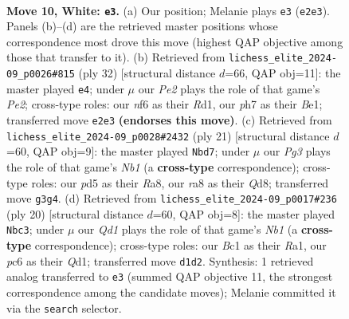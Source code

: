 \documentclass[11pt]{article}
\begin{document}
\clearpage

\begin{figure}[p]\centering
\begin{subfigure}{0.46\textwidth}\centering
\resizebox{\linewidth}{!}{%
\newchessgame
\chessboard[
  setfen={rnbq1rk1/pp2b1pp/2p2n2/3p1p2/3P4/1P3NP1/P3PPBP/RNBQR1K1 w - - 2 10},
  showmover=false,
  pgfstyle=straightmove, color=movearrow, markmove={e2-e3}
]}
\caption{}
\end{subfigure}\hfill
\begin{subfigure}{0.46\textwidth}\centering
\resizebox{\linewidth}{!}{%
\newchessgame
\chessboard[
  setfen={r1bq1rk1/1p2bpp1/2pnp2p/p7/3P4/2P2NP1/P1Q1PPBP/R2RB1K1 w - - 2 17},
  showmover=false,
  pgfstyle=straightmove, color=movearrow, markmove={e2-e4}
]}
\caption{}
\end{subfigure}
\\[4pt]
\begin{subfigure}{0.46\textwidth}\centering
\resizebox{\linewidth}{!}{%
\newchessgame
\chessboard[
  setfen={rnbqr1k1/1p3pbp/p2p1np1/2pP4/P7/2N3P1/1P1NPPBP/R1BQ1RK1 b - - 0 11},
  showmover=false,
  pgfstyle=straightmove, color=movearrow, markmove={b8-d7}
]}
\caption{}
\end{subfigure}\hfill
\begin{subfigure}{0.46\textwidth}\centering
\resizebox{\linewidth}{!}{%
\newchessgame
\chessboard[
  setfen={r1bq1rk1/1pp1bppp/3p1n2/p1nP4/2P5/6P1/PP2NPBP/RNBQ1RK1 w - - 1 11},
  showmover=false,
  pgfstyle=straightmove, color=movearrow, markmove={b1-c3}
]}
\caption{}
\end{subfigure}
\caption{\textbf{Move 10, White: \texttt{e3}.} (a) Our position; Melanie plays \texttt{e3} (\texttt{e2e3}). Panels (b)--(d) are the retrieved master positions whose correspondence most drove this move (highest QAP objective among those that transfer to it). (b) Retrieved from \texttt{lichess\_elite\_2024-09\_p0026\#815} (ply 32) [structural distance $d$=66, QAP obj=11]: the master played \texttt{e4}; under $\mu$ our \emph{Pe2} plays the role of that game's \emph{Pe2}; cross-type roles: our \emph{n}f6 as their \emph{R}d1, our \emph{p}h7 as their \emph{B}e1; transferred move \texttt{e2e3} \textbf{(endorses this move)}. (c) Retrieved from \texttt{lichess\_elite\_2024-09\_p0028\#2432} (ply 21) [structural distance $d$=60, QAP obj=9]: the master played \texttt{Nbd7}; under $\mu$ our \emph{Pg3} plays the role of that game's \emph{Nb1} (a \textbf{cross-type} correspondence); cross-type roles: our \emph{p}d5 as their \emph{R}a8, our \emph{r}a8 as their \emph{Q}d8; transferred move \texttt{g3g4}. (d) Retrieved from \texttt{lichess\_elite\_2024-09\_p0017\#236} (ply 20) [structural distance $d$=60, QAP obj=8]: the master played \texttt{Nbc3}; under $\mu$ our \emph{Qd1} plays the role of that game's \emph{Nb1} (a \textbf{cross-type} correspondence); cross-type roles: our \emph{B}c1 as their \emph{R}a1, our \emph{p}c6 as their \emph{Q}d1; transferred move \texttt{d1d2}. Synthesis: 1 retrieved analog transferred to \texttt{e3} (summed QAP objective 11, the strongest correspondence among the candidate moves); Melanie committed it via the \texttt{search} selector.}
\label{fig:thought-m18}
\end{figure}
\end{document}
